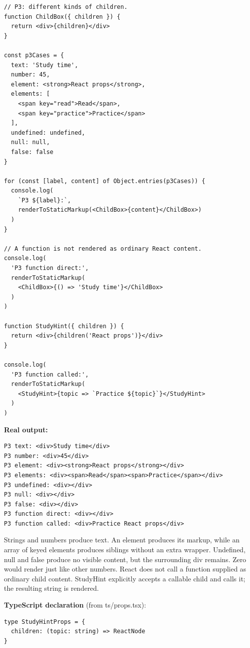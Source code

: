 \documentclass[10pt,a4paper]{article}
\begin{document}
\begin{lstlisting}[language=GuideJS]
// P3: different kinds of children.
function ChildBox({ children }) {
  return <div>{children}</div>
}

const p3Cases = {
  text: 'Study time',
  number: 45,
  element: <strong>React props</strong>,
  elements: [
    <span key="read">Read</span>,
    <span key="practice">Practice</span>
  ],
  undefined: undefined,
  null: null,
  false: false
}

for (const [label, content] of Object.entries(p3Cases)) {
  console.log(
    `P3 ${label}:`,
    renderToStaticMarkup(<ChildBox>{content}</ChildBox>)
  )
}

// A function is not rendered as ordinary React content.
console.log(
  'P3 function direct:',
  renderToStaticMarkup(
    <ChildBox>{() => 'Study time'}</ChildBox>
  )
)

function StudyHint({ children }) {
  return <div>{children('React props')}</div>
}

console.log(
  'P3 function called:',
  renderToStaticMarkup(
    <StudyHint>{topic => `Practice ${topic}`}</StudyHint>
  )
)
\end{lstlisting}


\textbf{Real output:}

\begin{lstlisting}[language={}]
P3 text: <div>Study time</div>
P3 number: <div>45</div>
P3 element: <div><strong>React props</strong></div>
P3 elements: <div><span>Read</span><span>Practice</span></div>
P3 undefined: <div></div>
P3 null: <div></div>
P3 false: <div></div>
P3 function direct: <div></div>
P3 function called: <div>Practice React props</div>
\end{lstlisting}

Strings and numbers produce text. An element produces its markup, while an array of keyed elements produces siblings without an extra wrapper. Undefined, null and false produce no visible content, but the surrounding div remains. Zero would render just like other numbers. React does not call a function supplied as ordinary child content. StudyHint explicitly accepts a callable child and calls it; the resulting string is rendered.


\textbf{TypeScript declaration} (from ts/props.tsx):

\begin{lstlisting}[language=GuideJS]
type StudyHintProps = {
  children: (topic: string) => ReactNode
}
\end{lstlisting}
\end{document}
